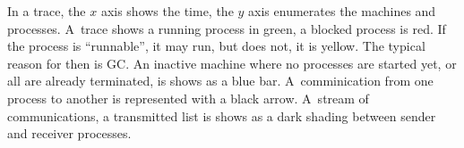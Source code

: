In a trace, the $x$ axis shows the time, the $y$ axis enumerates the machines and processes. A~trace shows a running process in green, a blocked process is red. If the process is \enquote{runnable}, \ie it may run, but does not, it is yellow. The typical reason for then is GC. An inactive machine where no processes are started yet, or all are already terminated, is shows as a blue bar. A~comminication from one process to another is represented with a black arrow. A~stream of communications, \eg a transmitted list is shows as a dark shading between sender and receiver processes.



